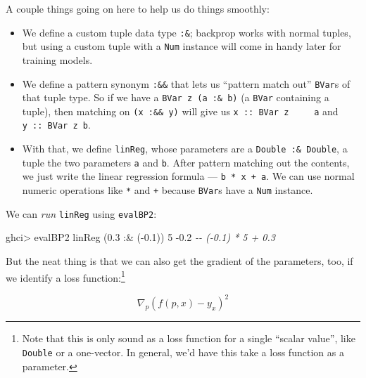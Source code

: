 \documentclass[]{article}
\newenvironment{Shaded}{}{}
\newcommand{\CommentTok}[1]{\textcolor[rgb]{0.38,0.63,0.69}{\textit{#1}}}
\newcommand{\DecValTok}[1]{\textcolor[rgb]{0.25,0.63,0.44}{#1}}
\newcommand{\FloatTok}[1]{\textcolor[rgb]{0.25,0.63,0.44}{#1}}
\newcommand{\NormalTok}[1]{#1}
\newcommand{\OperatorTok}[1]{\textcolor[rgb]{0.40,0.40,0.40}{#1}}
\begin{document}
A couple things going on here to help us do things smoothly:

\begin{itemize}
\item
  We define a custom tuple data type \texttt{:\&}; backprop works with normal
  tuples, but using a custom tuple with a \texttt{Num} instance will come in
  handy later for training models.
\item
  We define a pattern synonym \texttt{:\&\&} that lets us ``pattern match out''
  \texttt{BVar}s of that tuple type. So if we have a
  \texttt{BVar\ z\ (a\ :\&\ b)} (a \texttt{BVar} containing a tuple), then
  matching on \texttt{(x\ :\&\&\ y)} will give us
  \texttt{x\ ::\ BVar\ z\ \ \ \ \ a} and \texttt{y\ ::\ BVar\ z\ b}.
\item
  With that, we define \texttt{linReg}, whose parameters are a
  \texttt{Double\ :\&\ Double}, a tuple the two parameters \texttt{a} and
  \texttt{b}. After pattern matching out the contents, we just write the linear
  regression formula --- \texttt{b\ *\ x\ +\ a}. We can use normal numeric
  operations like \texttt{*} and \texttt{+} because \texttt{BVar}s have a
  \texttt{Num} instance.
\end{itemize}

We can \emph{run} \texttt{linReg} using \texttt{evalBP2}:

\begin{Shaded}
\begin{Highlighting}[]
\NormalTok{ghci}\OperatorTok{\textgreater{}}\NormalTok{ evalBP2 linReg (}\FloatTok{0.3} \OperatorTok{:\&}\NormalTok{ (}\OperatorTok{{-}}\FloatTok{0.1}\NormalTok{)) }\DecValTok{5}
\OperatorTok{{-}}\FloatTok{0.2}        \CommentTok{{-}{-} ({-}0.1) * 5 + 0.3}
\end{Highlighting}
\end{Shaded}

But the neat thing is that we can also get the gradient of the parameters, too,
if we identify a loss function:\footnote{Note that this is only sound as a loss
  function for a single ``scalar value'', like \texttt{Double} or a one-vector.
  In general, we'd have this take a loss function as a parameter.}

\[
\nabla_p (f(p, x) - y_x)^2
\]
\end{document}

